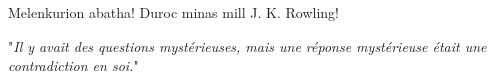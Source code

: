 Melenkurion abatha! Duroc minas mill J. K. Rowling!

"\emph{Il y avait des questions mystérieuses, mais une réponse mystérieuse était une contradiction en soi.}"


